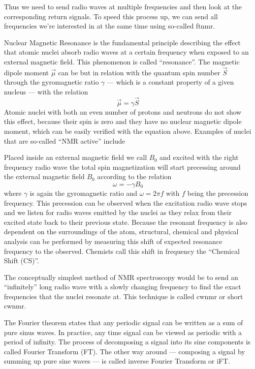 Thus we need to send radio waves at multiple frequencies and then look at the corresponding return signals. To speed this process up, we can send all frequencies we're interested in at the same time using so-called \acrshort{ftnmr}.



Nuclear Magnetic Resonance is the fundamental principle describing the effect that atomic nuclei absorb radio waves at a certain frequency when exposed to an external magnetic field. This phenomenon is called \enquote{resonance}. The magnetic dipole moment \(\vec{\mu}\) can be but in relation with the quantum spin number \(\vec{S}\) through the gyromagnetic ratio \(\gamma\) --- which is a constant property of a given nucleus --- with the relation
\[
    \vec{\mu} = \gamma\vec{S}
\]
Atomic nuclei with both an even number of protons and neutrons do not show this effect, because their spin is zero and they have no nuclear magnetic dipole moment, which can be easily verified with the equation above. Examples of nuclei that are so-called \enquote{NMR active} include \ch{}

Placed inside an external magnetic field we call \(B_0\) and excited with the right frequency radio wave the total spin magnetization will start precessing around the external magnetic field \(B_0\) according to the relation
\[
    \omega = -\gamma{}B_0
\]
where \(\gamma\) is again the gyromagnetic ratio and \(\omega = 2\pi{}f\) with \(f\) being the precession frequency. This precession can be observed when the excitation radio wave stops and we listen for radio waves emitted by the nuclei as they relax from their excited state back to their previous state. Because the resonant frequency is also dependent on the surroundings of the atom, structural, chemical and physical analysis can be performed by measuring this shift of expected resonance frequency to the observed. Chemists call this shift in frequency the \enquote{Chemical Shift (CS)}.

The conceptually simplest method of NMR spectroscopy would be to send an \enquote{infinitely} long radio wave with a slowly changing frequency to find the exact frequencies that the nuclei resonate at. This technique is called \acrlong{cwnmr} or short \acrshort{cwnmr}.

The Fourier theorem states that any periodic signal can be written as a sum of pure sinus waves. In practice, any time signal can be viewed as periodic with a period of infinity. The process of decomposing a signal into its sine components is called Fourier Transform (FT). The other way around --- composing a signal by summing up pure sine waves --- is called inverse Fourier Transform or iFT.

